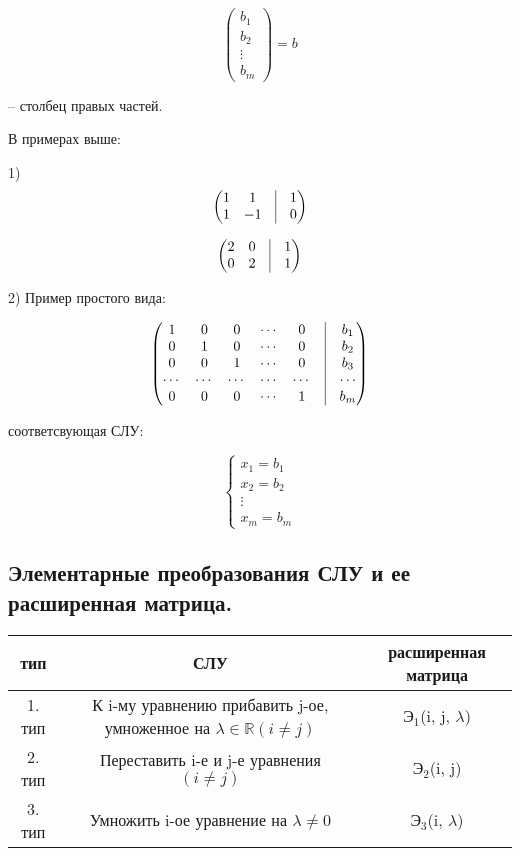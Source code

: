 \[
	\begin{pmatrix}
		b_1 \\
        b_2 \\
        \vdots \\
        b_m
	\end{pmatrix}
    = b
\]

-- столбец правых частей.

\vspace{\baselineskip}
В примерах выше:

1) 
\[
	\begin{pmatrix}
		1 & 1 & \vrule & 1 \\
        1 & -1 & \vrule & 0 
	\end{pmatrix}
\]

\[
	\begin{pmatrix}
		2 & 0 & \vrule & 1 \\
        0 & 2 & \vrule & 1 
	\end{pmatrix}
\]

\vspace{\baselineskip}
2) Пример простого вида:

\[
	\begin{pmatrix}
		1 & 0 & 0 & \cdots & 0 & \vrule & b_1 \\
		0 & 1 & 0 & \cdots & 0 & \vrule & b_2 \\
        0 & 0 & 1 & \cdots & 0 & \vrule & b_3 \\
        \cdots & \cdots & \cdots & \cdots & \cdots & \vrule & \cdots \\
        0 & 0 & 0 & \cdots & 1 & \vrule & b_m 
	\end{pmatrix}
\]

соответсвующая СЛУ:

\[
    \left\{
		\begin{aligned}
        x_1 = b_1 \\
        x_2 = b_2 \\
        \vdots \\
        x_m = b_m
		\end{aligned}
	\right.
\]

\subsection{Элементарные преобразования СЛУ и ее расширенная матрица.}

\vspace{\baselineskip}
\begin{table}[!ht]
		\begin{tabular}{c|c|c}
    	тип & СЛУ & расширенная матрица \\
        \hline
        1. тип & К i-му уравнению прибавить j-ое, умноженное на $\lambda \in \mathbb{R} (i \neq j)$ & $Э_1$(i, j, $\lambda$) \\
        2. тип & Переставить i-е и j-е уравнения $(i \neq j)$  & $Э_2$(i, j) \\
        3. тип & Умножить i-ое уравнение на $\lambda \neq 0$ & $Э_3$(i, $\lambda$) 
		\end{tabular}
\end{table}

